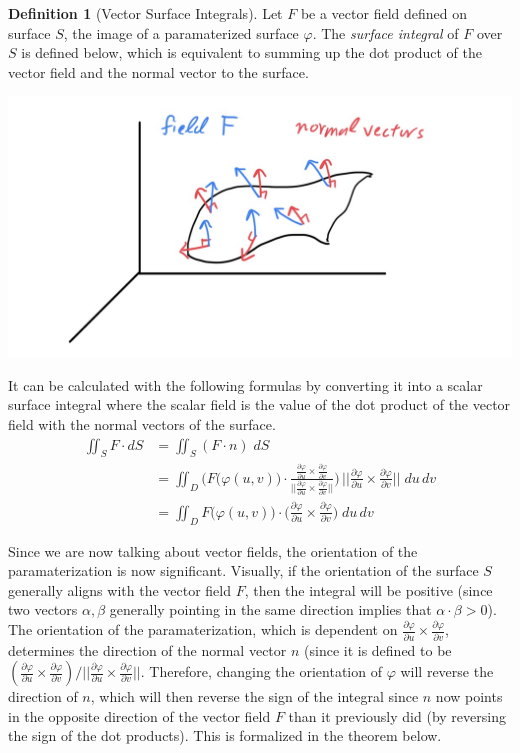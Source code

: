 \documentclass{article}
\theoremstyle{remark}
\theoremstyle{definition}
\newtheorem{definition}{Definition}[section]
\begin{document}
\begin{definition}[Vector Surface Integrals]
Let $F$ be a vector field defined on surface $S$, the image of a paramaterized surface $\varphi$. The \textit{surface integral} of $F$ over $S$ is defined below, which is equivalent to summing up the dot product of the vector field and the normal vector to the surface. 
\begin{center}
    \includegraphics[scale=0.3]{img/Vector_Surface_Integral.jpg}
\end{center}
It can be calculated with the following formulas by converting it into a scalar surface integral where the scalar field is the value of the dot product of the vector field with the normal vectors of the surface. 
\begin{align*}
    \iint_{S} F \cdot d S & = \iint_S (F \cdot n) \; dS \\
    & = \iint_D \Bigg( F\big( \varphi(u, v)\big) \cdot \frac{\frac{\partial \varphi}{\partial u} \times \frac{\partial \varphi}{\partial v}}{\Big|\Big|\frac{\partial \varphi}{\partial u} \times \frac{\partial \varphi}{\partial v} \Big|\Big|} \Bigg) \, \bigg|\bigg|\frac{\partial \varphi}{\partial u} \times \frac{\partial \varphi}{\partial v}\bigg|\bigg|\; du\,dv \\
    & = \iint_D F\big(\varphi(u, v)\big) \cdot \bigg( \frac{\partial \varphi}{\partial u} \times \frac{\partial \varphi}{\partial v}\bigg) \; du\,dv
\end{align*}
\end{definition}

Since we are now talking about vector fields, the orientation of the paramaterization is now significant. Visually, if the orientation of the surface $S$ generally aligns with the vector field $F$, then the integral will be positive (since two vectors $\alpha, \beta$ generally pointing in the same direction implies that $\alpha \cdot \beta > 0$). The orientation of the paramaterization, which is dependent on $\frac{\partial \varphi}{\partial u} \times \frac{\partial \varphi}{\partial v}$, determines the direction of the normal vector $n$ (since it is defined to be $(\frac{\partial \varphi}{\partial u} \times \frac{\partial \varphi}{\partial v}) / \big|\big|\frac{\partial \varphi}{\partial u} \times \frac{\partial \varphi}{\partial v}\big|\big|$. Therefore, changing the orientation of $\varphi$ will reverse the direction of $n$, which will then reverse the sign of the integral since $n$ now points in the opposite direction of the vector field $F$ than it previously did (by reversing the sign of the dot products). This is formalized in the theorem below. 
\end{document}
